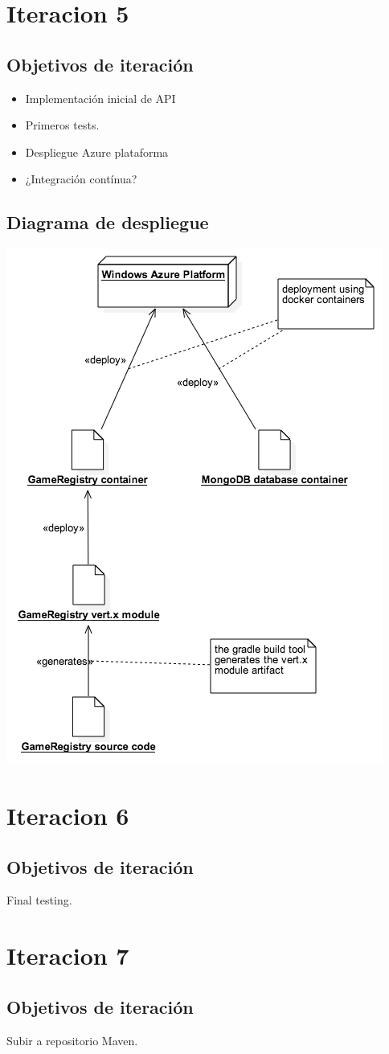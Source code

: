 \documentclass[12pt,a4paper]{report}
\begin{document}
\chapter{Iteracion 5}
\section{Objetivos de iteración}
\begin{itemize}
  \item Implementación inicial de API
  \item Primeros tests.
  \item Despliegue Azure plataforma
  \item ¿Integración contínua?
\end{itemize}

\section{Diagrama de despliegue}
\begin{center}
 \includegraphics[scale=0.6]{diagrams/docker_deployment_diagram.png}
\end{center}
 
\chapter{Iteracion 6}
\section{Objetivos de iteración}
Final testing.

\chapter{Iteracion 7}
\section{Objetivos de iteración}
Subir a repositorio Maven.
\end{document}
